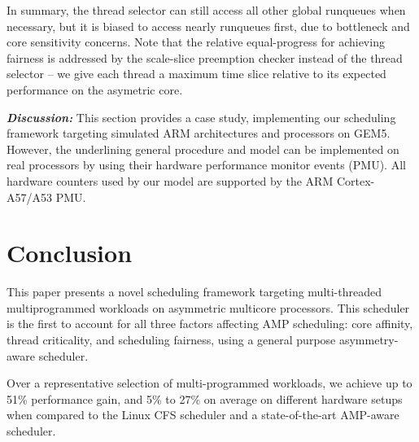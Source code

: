 \documentclass{sig-alternate}
\begin{document}
In summary, the thread selector can still access all other global runqueues when necessary, but it is biased to access nearly runqueues first, due to bottleneck and core sensitivity concerns. 
Note that the relative equal-progress for achieving fairness is addressed by the scale-slice preemption checker instead of the thread selector -- we give each thread a maximum time slice relative to its expected performance on the asymetric core.

\textbf{\textit{Discussion:}}
This section provides a case study, implementing our scheduling framework targeting simulated ARM architectures and processors on GEM5.  However, the underlining general procedure and model can be implemented on real processors by using their hardware performance monitor events (PMU). All hardware counters used by our model are supported by the ARM Cortex-A57/A53 \cite{ARMA57} PMU.


\vspace{10mm}
\section{Conclusion}
This paper presents a novel scheduling framework targeting multi-threaded multiprogrammed workloads on asymmetric multicore processors. This scheduler is the first to account for all three factors affecting AMP scheduling: core affinity, thread criticality, and scheduling fairness, using a general purpose asymmetry-aware scheduler.

Over a representative selection of multi-programmed workloads, we achieve up to 51\% performance gain, and 5\% to 27\% on average on different hardware setups when compared to the Linux CFS scheduler and a state-of-the-art AMP-aware scheduler.



\end{document}
